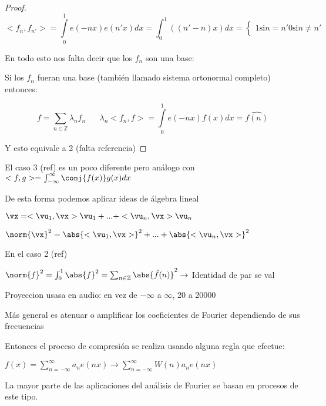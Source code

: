 \begin{proof}

	$$< f_n, f_{n'}> = \int\limits^1_0 e(-nx) e(n'x) dx = \int^1_0 ((n' -n)x) dx = 
	\begin{cases}
		1 \mbox{si} n = n'
		0 \mbox{si} n\neq n'
	\end{cases}$$

	En todo esto nos falta decir que los $f_n$ son una base: 

	Si los $f_n$ fueran una base (también llamado sistema ortonormal completo) entonces:

	$$f = \sum_{n \in \mathbb{Z}} \lambda_n f_n \;\;\;\;\;\; \lambda_n <f_n, f> = \int\limits^{1}_0 e(-nx) f(x) dx = \hat{f(n)}$$

	Y esto equivale a 2 (falta referencia)

\end{proof}

\begin{prop}

	El caso 3 (ref) es un poco diferente pero análogo con $<f,g> = \int^{\infty}_{-\infty} \conj{f(x)} g(x) dx$

\end{prop}

\begin{corol}
	De esta forma podemos aplicar ideas de álgebra lineal

	$\vx = <\vu_1, \vx>\vu_1 + ... + <\vu_n, \vx>\vu_n$

	$\norm{\vx}^2 = \abs{<\vu_1, \vx>}^2 + ... + \abs{<\vu_n, \vx>}^2$

	En el caso 2 (ref)

	$\norm{f}^2 = \int^1_0 \abs{f}^2 = \sum_{n \in \mathbb{Z}} \abs{\hat{f}(n)}^2 \rightarrow$ Identidad de par se val  


\end{corol}







Proyeccion usasa en audio: en vez de $-\infty$ a $\infty$, 20 a 20000

Más general es atenuar o amplificar los coeficientes de Fourier dependiendo de sus frecuencias

Entonces el proceso de compresión se realiza usando alguna regla que efectue:

$f(x) = \sum\limits^{\infty}_{n = -\infty} a_n e(nx) \rightarrow \sum\limits^{\infty}_{n = - \infty} W(n) a_n e(nx)$

La mayor parte de las aplicaciones del análisis de Fourier se basan en procesos de este tipo.

